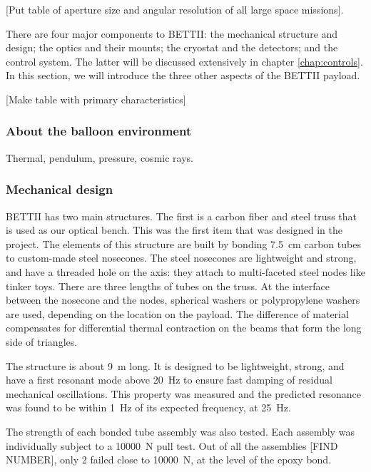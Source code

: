 [Put table of aperture size and angular resolution of all large space missions].

There are four major components to BETTII: the mechanical structure and design; the optics and their mounts; the cryostat and the detectors; and the control system. The latter will be discussed extensively in chapter \ref{chap:controls}. In this section, we will introduce the three other aspects of the BETTII payload.

[Make table with primary characteristics]

\subsubsection{About the balloon environment}

Thermal, pendulum, pressure, cosmic rays.

\subsubsection{Mechanical design}

BETTII has two main structures. The first is a carbon fiber and steel truss that is used as our optical bench. This was the first item that was designed in the project. The elements of this structure are built by bonding \SI{7.5}{\centi\meter} carbon tubes to custom-made steel nosecones. The steel nosecones are lightweight and strong, and have a threaded hole on the axis: they attach to multi-faceted steel nodes like tinker toys. There are three lengths of tubes on the truss. At the interface between the nosecone and the nodes, spherical washers or polypropylene washers are used, depending on the location on the payload. The difference of material compensates for differential thermal contraction on the beams that form the long side of triangles.

The structure is about \SI{9}{\meter} long. It is designed to be lightweight, strong, and have a first resonant mode above \SI{20}{\hertz} to ensure fast damping of residual mechanical oscillations. This property was measured and the predicted resonance was found to be within \SI{1}{\hertz} of its expected frequency, at \SI{25}{\hertz}.

The strength of each bonded tube assembly was also tested. Each assembly was individually subject to a \SI{10000}{\newton} pull test. Out of all the assemblies [FIND NUMBER], only 2 failed close to \SI{10000}{\newton}, at the level of the epoxy bond. 

